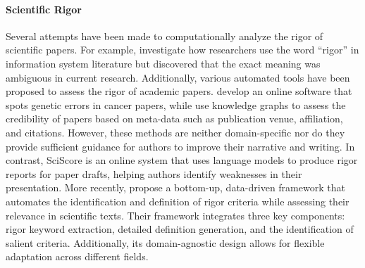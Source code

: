 












\paragraph{Scientific Rigor} 


Several attempts have been made to computationally analyze the rigor of scientific papers. For example, \citet{Wael} investigate how researchers use the word ``rigor'' in information system literature but discovered that the exact meaning was ambiguous in current research. Additionally, various automated tools have been proposed to assess the rigor of academic papers. \citet{phillips2017online} develop an online software that spots genetic errors in cancer papers, while \citet{sun2022assessing} use knowledge graphs to assess the credibility of papers based on meta-data such as publication venue, affiliation, and citations. 
However, these methods are neither domain-specific nor do they provide sufficient guidance for authors to improve their narrative and writing.
In contrast, SciScore \cite{SciScore_2024} is an online system that uses language models to produce rigor reports for paper drafts, helping authors identify weaknesses in their presentation. 
More recently, \citet{james-etal-2024-rigour} propose a bottom-up, data-driven framework that automates the identification and definition of rigor criteria while assessing their relevance in scientific texts. Their framework integrates three key components: rigor keyword extraction, detailed definition generation, and the identification of salient criteria. Additionally, its domain-agnostic design allows for flexible adaptation across different fields.

